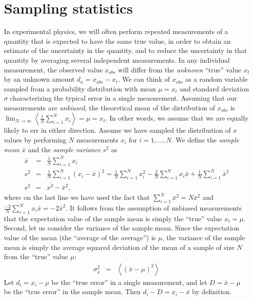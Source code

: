 \documentclass{revtex4}
\begin{document}
\section{Sampling statistics}
In experimental physics, we will often perform repeated measurements
of a quantity that is expected to have the same true value, in order
to obtain an estimate of the uncertainty in the quantity, and to
reduce the uncertainty in that quantity by averaging several
independent measurements. In any individual measurement, the observed
value $x_{obs}$ will differ from the \emph{unknown} ``true'' value $x_t$
by an unknown amount $d_x = x_{obs} - x_t$. We can think of $x_{obs}$
as a random variable sampled from a probability distribution with mean
$\mu = x_t$ and standard deviation $\sigma$ characterizing the typical
error in a single measurement. Assuming
that our measurements are \emph{unbiased}, the theoretical mean of the
distribution of $x_{obs}$ is $\lim_{N \rightarrow \infty}
\left<\frac{1}{N} \sum_{i=1}^N x_i \right> = \mu = x_t$. In other words, we assume that we are
equally likely to err in either direction. Assume we have sampled the distribution of $x$ values by
performing $N$ measurements $x_i$ for $i=1,\ldots,N$. We define the \emph{sample mean} $\bar{x}$ and the \emph{sample variance} $s^2$ as 
\begin{eqnarray}
  \bar{x} &=& \frac{1}{N} \sum_{i=1}^{N} x_i \label{samplemean} \\
  s^2 &=& \frac{1}{N} \sum_{i=1}^{N} (x_i - \bar{x})^2 = \frac{1}{N} \sum_{i=1}^N x_i^2 -\frac{2}{N} \sum_{i=1}^{N} x_i \bar{x} + \frac{1}{N} \sum_{i=1}^N \bar{x}^2 \nonumber \\
  s^2 &=& \overline{x^2} - \bar{x}^2 \label{samplevariance},
\end{eqnarray}
where on the last line we have used the fact that
$\sum_{i=1}^N \bar{x}^2 =  N\bar{x}^2$ and
$\frac{-2}{N}\sum_{i=1}^N x_i \bar{x} = -2\bar{x}^2$. It follows from
the assumption of unbiased measurements that the expectation value of
the sample mean is simply the ``true'' value $x_t = \mu$. Second, let us
consider the variance of the sample mean. Since the expectation value
of the mean (the ``average of the average'') is $\mu$, the variance of
the sample mean is simply the average squared deviation of the mean of a sample of
size $N$ from the ``true'' value $\mu$:
\begin{eqnarray}
  \sigma_{\bar{x}}^2 &=& \left<(\bar{x} - \mu)^2 \right>
\end{eqnarray}
Let $d_i = x_i - \mu$ be the ``true error'' in a single measurement,
and let $D = \bar{x} - \mu$ be the ``true error'' in the sample mean. Then
$d_i - D = x_i - \bar{x}$ by definition.
\end{document}
